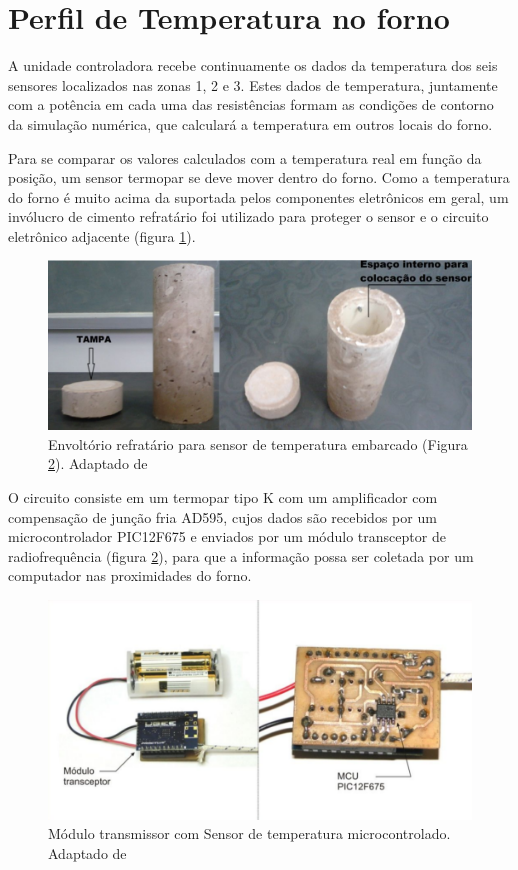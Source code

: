  \section{Perfil de Temperatura no forno}
 
A unidade controladora recebe continuamente os dados da temperatura dos seis sensores localizados nas zonas 1, 2 e 3. Estes dados de temperatura, juntamente com a potência em cada uma das resistências formam as condições de contorno da simulação numérica, que calculará a temperatura em outros locais do forno. 

Para se comparar os valores calculados com a temperatura real em função da posição, um sensor termopar se deve mover dentro do forno. Como a temperatura do forno é muito acima da suportada pelos componentes eletrônicos em geral, um invólucro de cimento refratário foi utilizado para proteger o sensor e o circuito eletrônico adjacente (figura \ref{fig:envoltorio_sensor}).

\begin{figure}[H]
\centering
\includegraphics[width=\textwidth]{Figuras/envoltorio_sensor}
\caption{Envoltório refratário para sensor de temperatura embarcado (Figura \ref{fig:sensor_termeratura}). Adaptado de \citet{arthur}}
\label{fig:envoltorio_sensor}
\end{figure}

O circuito consiste em um termopar tipo K com um amplificador com compensação de junção fria AD595, cujos dados são recebidos por um microcontrolador PIC12F675 e enviados por um módulo transceptor de radiofrequência (figura \ref{fig:sensor_termeratura}), para que a informação possa ser coletada por um computador nas proximidades do forno.
 
\begin{figure}[H]
\centering
\includegraphics[width=\textwidth]{Figuras/sensor_termeratura}
\caption{Módulo transmissor com Sensor de temperatura microcontrolado. Adaptado de \citet{arthur}}
\label{fig:sensor_termeratura}
\end{figure}

